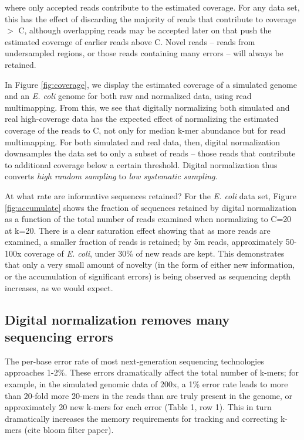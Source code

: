 \documentclass[10pt]{article}
\begin{document}
where only accepted reads contribute to the estimated coverage.  For
any data set, this has the effect of discarding the majority of reads
that contribute to coverage $>$ C, although overlapping reads may be
accepted later on that push the estimated coverage of earlier reads
above C.  Novel reads -- reads from undersampled regions, or those
reads containing many errors -- will always be retained.

In Figure \ref{fig:coverage}, we display the estimated coverage of a
simulated genome and an {\em E. coli} genome for both raw and
normalized data, using read multimapping.  From this,
we see that digitally normalizing both simulated and real
high-coverage data has the expected effect of normalizing the
estimated coverage of the reads to C, not only for median k-mer
abundance but for read multimapping.  For both simulated and real
data, then, digital normalization downsamples the data set to only a
subset of reads -- those reads that contribute to additional coverage
below a certain threshold.  Digital normalization thus converts {\em
  high random sampling} to {\em low systematic sampling}.

At what rate are informative sequences retained?  For the {\em E. coli} data
set, Figure \ref{fig:accumulate} shows the fraction of sequences
retained by digital normalization as a function of the total number of
reads examined when normalizing to C=20 at k=20.  There is a clear
saturation effect showing that as more reads are examined, a smaller
fraction of reads is retained; by 5m reads, approximately 50-100x
coverage of {\em E. coli}, under 30\% of new reads are kept.  This
demonstrates that only a very small amount of novelty (in the form of
either new information, or the accumulation of significant errors) is
being observed as sequencing depth increases, as we would expect.


\subsection*{Digital normalization removes many sequencing errors}

The per-base error rate of most next-generation sequencing technologies
approaches 1-2\%.  
These
errors dramatically affect the total number of k-mers; for example, in the
simulated genomic data of 200x, a 1\% error rate leads to more than
20-fold more 20-mers in the reads than are truly present in the genome,
or approximately 20 new k-mers for each error (Table 1, row 1).
This in turn dramatically increases the memory requirements for
tracking and correcting k-mers (cite bloom filter paper).
\end{document}
